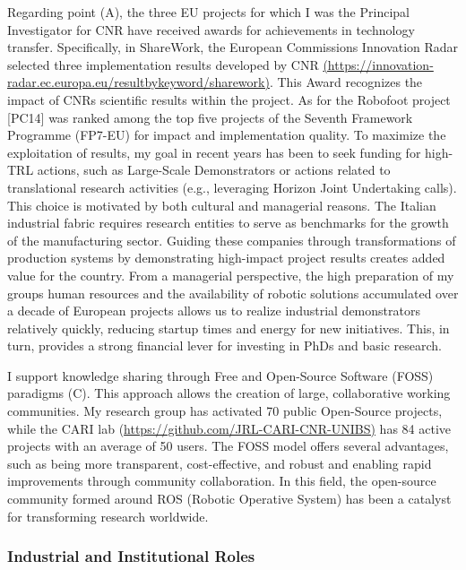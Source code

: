 Regarding point (A), the three EU projects for which I was the Principal
Investigator for CNR have received awards for achievements in technology
transfer. Specifically, in ShareWork, the European
Commission\textquotesingle s Innovation Radar selected three
implementation results developed by CNR
\href{https://innovation-radar.ec.europa.eu/resultbykeyword/sharework}{(https://innovation-radar.ec.europa.eu/resultbykeyword/sharework)}.
This Award recognizes the impact of CNR\textquotesingle s scientific
results within the project. As for the Robofoot project {[}PC14{]} was
ranked among the top five projects of the Seventh Framework Programme
(FP7-EU) for impact and implementation quality. To maximize the
exploitation of results, my goal in recent years has been to seek
funding for high-TRL actions, such as Large-Scale Demonstrators or
actions related to translational research activities (e.g., leveraging
Horizon Joint Undertaking calls). This choice is motivated by both
cultural and managerial reasons. The Italian industrial fabric requires
research entities to serve as benchmarks for the growth of the
manufacturing sector. Guiding these companies through transformations of
production systems by demonstrating high-impact project results creates
added value for the country. From a managerial perspective, the high
preparation of my group\textquotesingle s human resources and the
availability of robotic solutions accumulated over a decade of European
projects allows us to realize industrial demonstrators relatively
quickly, reducing startup times and energy for new initiatives. This, in
turn, provides a strong financial lever for investing in PhDs and basic
research.

I support knowledge sharing through Free and Open-Source Software (FOSS)
paradigms (C). This approach allows the creation of large, collaborative
working communities. My research group has activated 70 public
Open-Source projects, while the CARI lab
(\href{https://github.com/JRL-CARI-CNR-UNIBS}{https://github.com/JRL-CARI-CNR-UNIBS)}
has 84 active projects with an average of 50 users. The FOSS model
offers several advantages, such as being more transparent,
cost-effective, and robust and enabling rapid improvements through
community collaboration. In this field, the open-source community formed
around ROS (Robotic Operative System) has been a catalyst for
transforming research worldwide.

\subsubsection{Industrial and Institutional
Roles}\label{industrial-and-institutional-roles}

